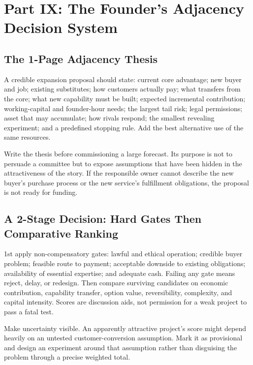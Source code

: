 \section*{Part IX: The Founder's Adjacency Decision System}
\label{sec:part9_founders_adjacency_decision_system}

\subsection{The 1-Page Adjacency Thesis}
\label{sec:one_page_adjacency_thesis}

A credible expansion proposal should state: current core advantage; new buyer and job; existing substitutes; how customers actually pay; what transfers from the core; what new capability must be built; expected incremental contribution; working-capital and founder-hour needs; the largest tail risk; legal permissions; asset that may accumulate; how rivals respond; the smallest revealing experiment; and a predefined stopping rule. Add the best alternative use of the same resources.

Write the thesis before commissioning a large forecast. Its purpose is not to persuade a committee but to expose assumptions that have been hidden in the attractiveness of the story. If the responsible owner cannot describe the new buyer's purchase process or the new service's fulfillment obligations, the proposal is not ready for funding.

\subsection{A 2-Stage Decision: Hard Gates Then Comparative Ranking}
\label{sec:two_stage_decision_gates_then_ranking}

1st apply non-compensatory gates: lawful and ethical operation; credible buyer problem; feasible route to payment; acceptable downside to existing obligations; availability of essential expertise; and adequate cash. Failing any gate means reject, delay, or redesign. Then compare surviving candidates on economic contribution, capability transfer, option value, reversibility, complexity, and capital intensity. Scores are discussion aids, not permission for a weak project to pass a fatal test.

Make uncertainty visible. An apparently attractive project's score might depend heavily on an untested customer-conversion assumption. Mark it as provisional and design an experiment around that assumption rather than disguising the problem through a precise weighted total.

